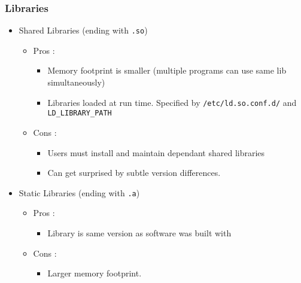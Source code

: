 \documentclass{beamer}
\newcommand{\code}[1]{\colorbox{codegray}{\texttt{#1}}}
\begin{document}
\begin{frame}
\frametitle{Libraries}
\begin{itemize}
    \item Shared Libraries (ending with \code{.so})
    \pause
    \begin{itemize}
        \item Pros : 
        \begin{itemize}
            \item Memory footprint is smaller (multiple programs can use same lib simultaneously)
            \pause
            \item Libraries loaded at run time. Specified by \code{/etc/ld.so.conf.d/} and \code{LD\_LIBRARY\_PATH}
            \bigskip
        \end{itemize}
        \item Cons : 
        \begin{itemize}
            \item Users must install and maintain dependant shared libraries
            \pause
            \item Can get surprised by subtle version differences.
        \end{itemize}
        \bigskip
    \pause
    \end{itemize}
    \item Static Libraries (ending with \code{.a})
    \pause
    \begin{itemize}
        \item Pros : 
        \begin{itemize}
            \item Library is same version as software was built with
            \bigskip
        \end{itemize}
        \item Cons : 
        \begin{itemize}
            \item Larger memory footprint.
            \pause
        \end{itemize}
    \end{itemize}
\end{itemize}
\end{frame}
\end{document}
